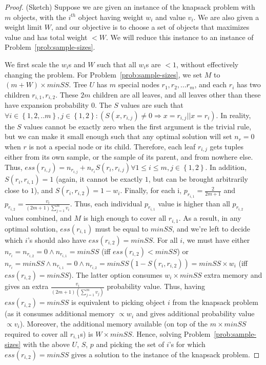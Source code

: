\begin{proof}(Sketch)
Suppose we are given an instance of the knapsack problem with $m$ objects, with the $i^{th}$ object having weight $w_i$ and value $v_i$. We are also given a weight limit $W$, and our objective is to choose a set of objects that maximizes value and has total weight $< W$. We will reduce this instance to an instance of Problem~\ref{prob:sample-sizes}.

We first scale the $w_i$s and $W$ such that all $w_i$s are $< 1$, without effectively changing the problem. For Problem~\ref{prob:sample-sizes}, we set $M$ to $(m + W) \times minSS$. Tree $U$ has $m$ special nodes $r_1, r_2, ... r_m$, and each $r_i$ has two children $r_{i,1}, r_{i,2}$. These $2m$ children are all leaves, and all leaves other than these have expansion probability $0$. 
The $S$ values are such that $\forall i \in \left\lbrace 1, 2, ..m\right\rbrace, j \in \left\lbrace 1, 2 \right\rbrace : (S(x, r_{i,j}) \neq 0 \Rightarrow x = r_{i,j} || x = r_i)$. In reality, the $S$ values cannot be exactly zero when the first argument is the trivial rule, but we can make it small enough such that any optimal solution will set $n_r = 0$ when $r$ is not a special node or its child. Therefore, each leaf $r_{i,j}$ gets tuples either from its own sample, or the sample of its parent, and from nowhere else. Thus, $ess(r_{i,j}) = n_{r_{i,j}} + n_{r_i}S(r_i, r_{i,j}) \forall 1 \leq i \leq m, j \in \left\lbrace 1,2 \right\rbrace$. In addition, $S(r_i, r_{i,1}) = 1$ (again, it cannot be exactly $1$, but can be brought arbitrarily close to $1$), and $S(r_i, r_{i,2}) = 1 - w_i$. Finally, for each i, $p_{r_{i,1}} = \frac{2}{2m+1}$ and $p_{r_{i,2}} = \frac{v_i}{(2m+1)\sum_{j=1}^{m}v_i}$. Thus, each individual $p_{r_{i,1}}$ value is higher than all $p_{r_{i,2}}$ values combined, and $M$ is high enough to cover all $r_{i,1}$. As a result, in any optimal solution, $ess(r_{i,1})$ must be equal to $minSS$, and we're left to decide which $i$'s should also have $ess(r_{i,2}) = minSS$. For all $i$, we must have either $n_{r_i} = n_{r_{i,2}} = 0 \land n_{r_{i,1}} = minSS$ (iff $ess(r_{i,2}) < minSS$) or $n_{r_i} = minSS \land n_{r_{i,1}} = 0 \land n_{r_{i,2}} = minSS (1 - S(r_i, r_{i,2})) = minSS \times w_i$ (iff $ess(r_{i,2}) = minSS$). The latter option consumes $w_i \times minSS$ extra memory and gives an extra $\frac{v_i}{(2m+1)(\sum_{j=1}^{m}v_j)}$ probability value. Thus, having $ess(r_{i,2}) = minSS$ is equivalent to picking object $i$ from the knapsack problem (as it consumes additional memory $\propto w_i$ and gives additional probability value $\propto v_i$). Moreover, the additional memory available (on top of the $m \times minSS$ required to cover all $r_{i,1}$s) is $W\times minSS$. Hence, solving Problem~\ref{prob:sample-sizes} with the above $U$, $S$, $p$ and picking the set of $i$'s for which $ess(r_{i,2}) = minSS$ gives a solution to the instance of the knapsack problem. 
\end{proof}

